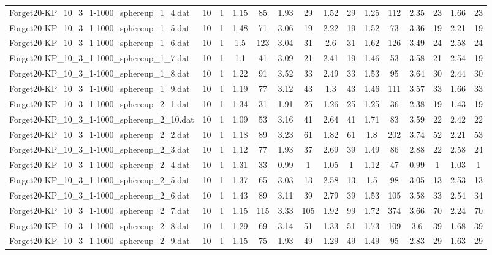 \begin{table}[!ht]
{\begin{tabular}{lcccccccccccccc}
Forget20-KP\_10\_3\_1-1000\_sphereup\_1\_4.dat & 10 & 1 & 1.15 & 85 & 1.93 & 29 & 1.52 & 29 & 1.25 & 112 & 2.35 & 23 & 1.66 & 23 \\
Forget20-KP\_10\_3\_1-1000\_sphereup\_1\_5.dat & 10 & 1 & 1.48 & 71 & 3.06 & 19 & 2.22 & 19 & 1.52 & 73 & 3.36 & 19 & 2.21 & 19 \\
Forget20-KP\_10\_3\_1-1000\_sphereup\_1\_6.dat & 10 & 1 & 1.5 & 123 & 3.04 & 31 & 2.6 & 31 & 1.62 & 126 & 3.49 & 24 & 2.58 & 24 \\
Forget20-KP\_10\_3\_1-1000\_sphereup\_1\_7.dat & 10 & 1 & 1.1 & 41 & 3.09 & 21 & 2.41 & 19 & 1.46 & 53 & 3.58 & 21 & 2.54 & 19 \\
Forget20-KP\_10\_3\_1-1000\_sphereup\_1\_8.dat & 10 & 1 & 1.22 & 91 & 3.52 & 33 & 2.49 & 33 & 1.53 & 95 & 3.64 & 30 & 2.44 & 30 \\
Forget20-KP\_10\_3\_1-1000\_sphereup\_1\_9.dat & 10 & 1 & 1.19 & 77 & 3.12 & 43 & 1.3 & 43 & 1.46 & 111 & 3.57 & 33 & 1.66 & 33 \\
Forget20-KP\_10\_3\_1-1000\_sphereup\_2\_1.dat & 10 & 1 & 1.34 & 31 & 1.91 & 25 & 1.26 & 25 & 1.25 & 36 & 2.38 & 19 & 1.43 & 19 \\
Forget20-KP\_10\_3\_1-1000\_sphereup\_2\_10.dat & 10 & 1 & 1.09 & 53 & 3.16 & 41 & 2.64 & 41 & 1.71 & 83 & 3.59 & 22 & 2.42 & 22 \\
Forget20-KP\_10\_3\_1-1000\_sphereup\_2\_2.dat & 10 & 1 & 1.18 & 89 & 3.23 & 61 & 1.82 & 61 & 1.8 & 202 & 3.74 & 52 & 2.21 & 53 \\
Forget20-KP\_10\_3\_1-1000\_sphereup\_2\_3.dat & 10 & 1 & 1.12 & 77 & 1.93 & 37 & 2.69 & 39 & 1.49 & 86 & 2.88 & 22 & 2.58 & 24 \\
Forget20-KP\_10\_3\_1-1000\_sphereup\_2\_4.dat & 10 & 1 & 1.31 & 33 & 0.99 & 1 & 1.05 & 1 & 1.12 & 47 & 0.99 & 1 & 1.03 & 1 \\
Forget20-KP\_10\_3\_1-1000\_sphereup\_2\_5.dat & 10 & 1 & 1.37 & 65 & 3.03 & 13 & 2.58 & 13 & 1.5 & 98 & 3.05 & 13 & 2.53 & 13 \\
Forget20-KP\_10\_3\_1-1000\_sphereup\_2\_6.dat & 10 & 1 & 1.43 & 89 & 3.11 & 39 & 2.79 & 39 & 1.53 & 105 & 3.58 & 33 & 2.54 & 34 \\
Forget20-KP\_10\_3\_1-1000\_sphereup\_2\_7.dat & 10 & 1 & 1.15 & 115 & 3.33 & 105 & 1.92 & 99 & 1.72 & 374 & 3.66 & 70 & 2.24 & 70 \\
Forget20-KP\_10\_3\_1-1000\_sphereup\_2\_8.dat & 10 & 1 & 1.29 & 69 & 3.14 & 51 & 1.33 & 51 & 1.73 & 109 & 3.6 & 39 & 1.68 & 39 \\
Forget20-KP\_10\_3\_1-1000\_sphereup\_2\_9.dat & 10 & 1 & 1.15 & 75 & 1.93 & 49 & 1.29 & 49 & 1.49 & 95 & 2.83 & 29 & 1.63 & 29 \\

\end{tabular}}
\end{table}
